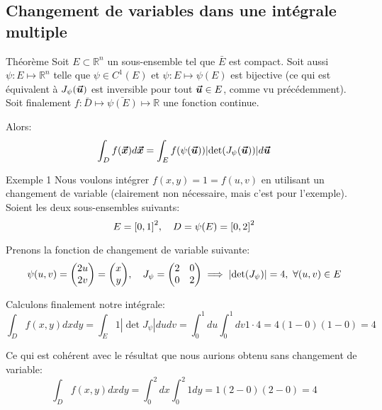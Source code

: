 \documentclass[a4paper]{article}
\begin{document}
\subsection[Changement de variables]{Changement de variables dans une intégrale multiple}
\begin{parag}{Théorème}
    Soit $E \subset \mathbb{R}^n$ un sous-ensemble tel que $\bar{E}$ est compact. Soit aussi $\psi : E \mapsto \mathbb{R}^n$ telle que $\psi \in C^1\left(E\right)$ et $\psi: E \mapsto \psi\left(E\right)$ est bijective (ce qui est équivalent à $J_{\psi}\left(\bvec{u}\right)$ est inversible pour tout $\bm{\protect\vec{u}} \in E$, comme vu précédemment). Soit finalement $f: \bar{D} \mapsto \bar{\psi\left(E\right)} \mapsto \mathbb{R}$ une fonction continue.

    Alors: 
    \[\int_{D} f\left(\bvec{x}\right)d \bvec{x} = \int_{E} f\left(\psi\left(\bvec{u}\right)\right) \left|\det\left(J_{\psi}\left(\bvec{u}\right)\right)\right|d \bvec{u}\]

\end{parag}

\begin{parag}{Exemple 1}
    Nous voulons intégrer $f\left(x, y\right) = 1 = f\left(u, v\right)$ en utilisant un changement de variable (clairement non nécessaire, mais c'est pour l'exemple). Soient les deux sous-ensembles suivants: 
    \[E = \left[0, 1\right]^2, \mathspace D = \psi\left(E\right) = \left[0, 2\right]^2\]
    
    Prenons la fonction de changement de variable suivante:
    \[\psi\left(u, v\right) = \begin{pmatrix} 2u \\ 2v \end{pmatrix} = \begin{pmatrix} x \\ y \end{pmatrix}, \mathspace J_{\psi} = \begin{pmatrix} 2 & 0 \\ 0 & 2 \end{pmatrix} \implies \left|\det\left(J_{\psi}\right)\right| = 4, \ \forall \left(u, v\right) \in E \]

    Calculons finalement notre intégrale: 
    \[\int_{D} f\left(x, y\right)dxdy = \int_{E} 1 \left|\det J_{\psi}\right|du dv = \int_{0}^{1} du \int_{0}^{1} dv 1 \cdot 4 = 4\left(1 - 0\right)\left(1 - 0\right) = 4\]
    
    Ce qui est cohérent avec le résultat que nous aurions obtenu sans changement de variable: 
    \[\int_D f\left(x, y\right)dxdy = \int_{0}^{2} dx \int_{0}^{2} 1dy = 1\left(2 - 0\right)\left(2 - 0\right) = 4\]
\end{parag}
\end{document}
